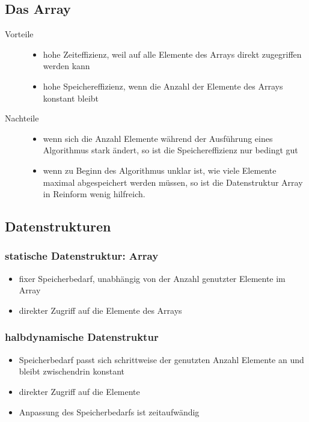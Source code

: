 \documentclass[a4paper,10pt]{article}
\begin{document}
\subsection{Das Array}

\begin{description}
	\item[Vorteile]  \hfill
		\begin{itemize}
			\item hohe Zeiteffizienz, weil auf alle Elemente des Arrays direkt zugegriffen werden kann
			\item hohe Speichereffizienz, wenn die Anzahl der Elemente des Arrays konstant bleibt
		\end{itemize}
	\item[Nachteile] \hfill
		\begin{itemize}
			\item wenn sich die Anzahl Elemente w\"ahrend der Ausf\"uhrung eines Algorithmus stark \"andert, so ist die Speichereffizienz nur bedingt gut
			\item wenn zu Beginn des Algorithmus unklar ist, wie viele Elemente maximal abgespeichert werden m\"ussen, so ist die Datenstruktur Array in Reinform wenig hilfreich.
		\end{itemize}
\end{description}

\subsection{Datenstrukturen}

\subsubsection{statische Datenstruktur: Array}
\begin{itemize}
	\item fixer Speicherbedarf, unabh\"angig von der Anzahl genutzter Elemente im Array
	\item direkter Zugriff auf die Elemente des Arrays
\end{itemize}

\subsubsection{halbdynamische Datenstruktur}
\begin{itemize}
	\item Speicherbedarf passt sich schrittweise der genutzten Anzahl Elemente an und bleibt zwischendrin konstant
	\item direkter Zugriff auf die Elemente
	\item Anpassung des Speicherbedarfs ist zeitaufw\"andig
\end{itemize}
\end{document}
